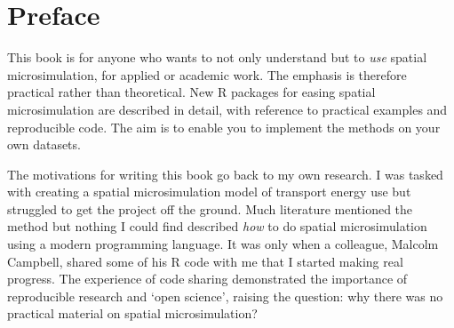 \chapter*{Preface}

This book is for anyone who wants to not only understand
but to \emph{use} spatial microsimulation, for applied or academic work.
The emphasis is therefore practical rather than theoretical.
New R packages for easing spatial microsimulation are described in
detail, with reference to practical examples and reproducible code.
The aim is to enable you to implement the methods on your own
datasets. 


The motivations for writing this book go back to my own research.
I was tasked with creating a spatial microsimulation model of transport energy use but struggled to get the project off the ground.
Much literature mentioned the method but nothing I could find
described \emph{how} to do spatial microsimulation
using a modern programming language.
It was only when a colleague, Malcolm Campbell, shared some of his
R code with me that I started making real progress. The experience
of code sharing demonstrated the importance of
reproducible research and `open science', raising the question:
why there was no practical material on spatial microsimulation?

